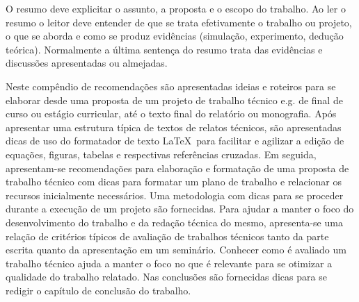 
O resumo deve explicitar o assunto, a proposta e o escopo do trabalho. Ao ler o resumo o leitor deve entender de que se trata efetivamente o trabalho ou projeto, o que se aborda e como se produz evidências (simulação, experimento, dedução teórica). Normalmente a última sentença do resumo trata das evidências e discussões apresentadas ou almejadas. 

Neste compêndio de recomendações são apresentadas ideias e roteiros para se elaborar desde uma proposta de um projeto de trabalho técnico e.g. de final de curso ou estágio curricular, até o texto final do relatório ou monografia. Após apresentar uma estrutura típica de textos de relatos técnicos, são apresentadas dicas de uso do formatador de texto \LaTeX\ para facilitar e agilizar a edição de equações, figuras, tabelas e respectivas referências cruzadas. Em seguida, apresentam-se recomendações para elaboração e formatação de uma proposta de trabalho técnico com dicas para formatar um plano de trabalho e relacionar os recursos inicialmente necessários. Uma metodologia com dicas para se proceder durante a execução de um projeto são fornecidas. Para ajudar a manter o foco do desenvolvimento do trabalho e da redação técnica do mesmo, apresenta-se uma relação de critérios típicos de avaliação de trabalhos técnicos tanto da parte escrita quanto da apresentação em um seminário. Conhecer como é avaliado um trabalho técnico  ajuda a manter o foco no que é relevante para se otimizar a qualidade do trabalho relatado. Nas conclusões são fornecidas dicas  para se redigir o capítulo de conclusão do trabalho.

